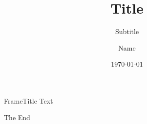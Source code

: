 \documentclass[10pt,pdf,utf8,russian]{beamer}
\title{Title}
\subtitle{Subtitle}
\date{\today}
\author{Name}
\begin{document}
\newcommand\imagewidth{\textwidth-2\baselineskip}
\newcommand\imageheight{\textheight-2\baselineskip}

\maketitle

\begin{frame}{FrameTitle}
  Text
\end{frame}

\begin{frame}[standout]
  \vfill
  The End
  \vfill
\end{frame}
\end{document}
